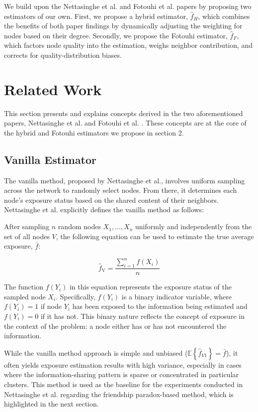 \documentclass{article}
\begin{document}
We build upon the Nettasinghe et al. and Fotouhi et al. papers by proposing two estimators of our own. First, we propose a hybrid estimator, \( \hat{f}_H \), which combines the benefits of both paper findings by dynamically adjusting the weighting for nodes based on their degree. Secondly, we propose the Fotouhi estimator, \( \hat{f}_F \), which factors node quality into the estimation, weighs neighbor contribution, and corrects for quality-distribution biases.

\section{Related Work}

This section presents and explains concepts derived in the two aforementioned papers, Nettasinghe et al. \cite{10.1145/3688599} and Fotouhi et al. \cite{fotouhi2014generalizedfriendshipparadoxanalytical}. These concepts are at the core of the hybrid and Fotouhi estimators we propose in section 2.

\subsection{Vanilla Estimator} 

The vanilla method, proposed by Nettasinghe et al., involves uniform sampling across the network to randomly select nodes. From there, it determines each node's exposure status based on the shared content of their neighbors. Nettasinghe et al. explicitly defines the vanilla method as follows:

After sampling \( n \) random nodes \( X_1, \ldots, X_n \) uniformly and independently from the set of all nodes \( V \), the following equation can be used to estimate the true average exposure, \( \bar{f} \):

\begin{equation}
\hat{f}_{\text{V}} = \frac{\sum_{i=1}^n f(X_i)}{n}
\label{eq:vanilla_estimate}
\end{equation}

The function \( f(Y_i) \) in this equation represents the exposure status of the sampled node \( X_i \). Specifically, \( f(Y_i) \) is a binary indicator variable, where \( f(Y_i) = 1 \) if node \( Y_i \) has been exposed to the information being estimated and \( f(Y_i) = 0 \) if it has not. This binary nature reflects the concept of exposure in the context of the problem: a node either has or has not encountered the information.

While the vanilla method approach is simple and unbiased (\(\mathbb{E} \left\{ \hat{f}_{V1} \right\} = \bar{f}\)), it often yields exposure estimation results with high variance, especially in cases where the information-sharing pattern is sparse or concentrated in particular clusters. This method is used as the baseline for the experiments conducted in Nettasinghe et al. regarding the friendship paradox-based method, which is highlighted in the next section.
\end{document}
